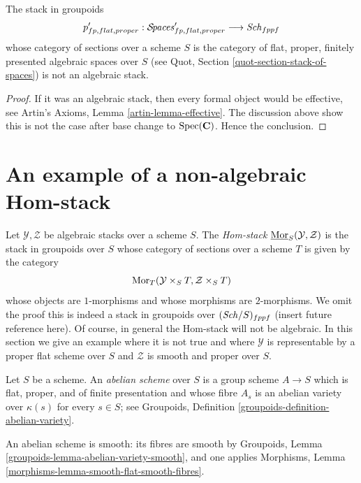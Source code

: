 \begin{lemma}
\label{lemma-proper-spaces-not-algebraic}
The stack in groupoids
$$
p'_{fp, flat, proper} :
\mathcal{S}\!\mathit{paces}'_{fp, flat, proper}
\longrightarrow
\mathit{Sch}_{fppf}
$$
whose category of sections over a scheme $S$ is the category of
flat, proper, finitely presented algebraic spaces over $S$
(see Quot, Section \ref{quot-section-stack-of-spaces})
is not an algebraic stack.
\end{lemma}

\begin{proof}
If it was an algebraic stack, then every formal object would be
effective, see Artin's Axioms, Lemma \ref{artin-lemma-effective}.
The discussion above show this is not the case
after base change to $\mathop{\mathrm{Spec}}(\mathbf{C})$.
Hence the conclusion.
\end{proof}






\section{An example of a non-algebraic Hom-stack}
\label{section-non-algebraic-hom-stack}

\noindent
Let $\mathcal{Y}, \mathcal{Z}$ be algebraic stacks over a scheme $S$.
The {\it Hom-stack} $\underline{\mathop{\mathrm{Mor}}\nolimits}_S(\mathcal{Y}, \mathcal{Z})$
is the stack in groupoids over $S$ whose category of sections over
a scheme $T$ is given by the category
$$
\mathop{\mathrm{Mor}}\nolimits_T(\mathcal{Y} \times_S T, \mathcal{Z} \times_S T)
$$
whose objects are $1$-morphisms and whose morphisms are $2$-morphisms.
We omit the proof this is indeed a stack in groupoids over
$(\mathit{Sch}/S)_{fppf}$ (insert future reference here). Of course, in
general the Hom-stack will not be algebraic. In this section we
give an example where it is not true and where $\mathcal{Y}$ is
representable by a proper flat scheme over $S$ and $\mathcal{Z}$
is smooth and proper over $S$.

\begin{definition}
\label{definition-abelian-scheme}
Let $S$ be a scheme. An {\it abelian scheme} over $S$ is a group
scheme $A \to S$ which is flat, proper, and of finite presentation and
whose fibre $A_s$ is an abelian variety over $\kappa(s)$ for every
$s \in S$; see Groupoids, Definition
\ref{groupoids-definition-abelian-variety}.
\end{definition}

\noindent
An abelian scheme is smooth: its fibres are smooth by Groupoids, Lemma
\ref{groupoids-lemma-abelian-variety-smooth}, and one applies Morphisms,
Lemma \ref{morphisms-lemma-smooth-flat-smooth-fibres}.

